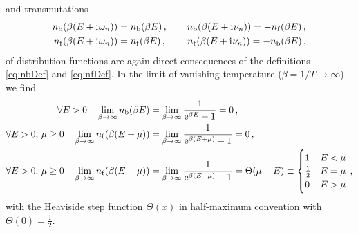 and transmutations 
\begin{align}
	n_\mathrm{b}(\beta(E+\mathrm{i}\mkern1mu\omega_n))&=n_\mathrm{b}(\beta E) \, ,\qquad n_\mathrm{b}(\beta(E+\mathrm{i}\mkern1mu\nu_n))=-n_\mathrm{f}(\beta E) \, ,\\
	n_\mathrm{f}(\beta(E+\mathrm{i}\mkern1mu\omega_n))&=n_\mathrm{f}(\beta E) \, ,\qquad\, n_\mathrm{f}(\beta(E+\mathrm{i}\mkern1mu\nu_n))=-n_\mathrm{b}(\beta E) \, ,
\end{align}
of distribution functions are again direct consequences of the definitions \eqref{eq:nbDef} and \eqref{eq:nfDef}.
In the limit of vanishing temperature ($\beta=1/T\rightarrow\infty$) we find
\begin{align}
	\forall E>0\quad \lim_{\beta\rightarrow\infty} \nb(\beta E) &= \lim_{\beta\rightarrow\infty} \frac{1}{\eu^{\beta E}-1} =0 \, ,\label{eq:nbZeroT}\\
	\forall E>0,\,\mu\geq 0\quad \lim_{\beta\rightarrow\infty} \nf(\beta (E+\mu)) &= \lim_{\beta\rightarrow\infty} \frac{1}{\eu^{\beta (E+\mu)}-1} =0 \, ,\label{eq:nfpmuZeroT}\\
	\forall E>0,\,\mu\geq 0\quad \lim_{\beta\rightarrow\infty} \nf(\beta (E-\mu)) &= \lim_{\beta\rightarrow\infty} \frac{1}{\eu^{\beta (E-\mu)}-1} = %
	\Theta(\mu-E)\equiv\begin{cases}1 & E<\mu\\ \tfrac{1}{2} & E=\mu \\ 0 & E>\mu \end{cases}\, , \label{eq:nfmmuZeroT}
\end{align}
with the Heaviside step function $\Theta(x)$ in half-maximum convention with $\Theta(0)=\tfrac{1}{2}$.\\

